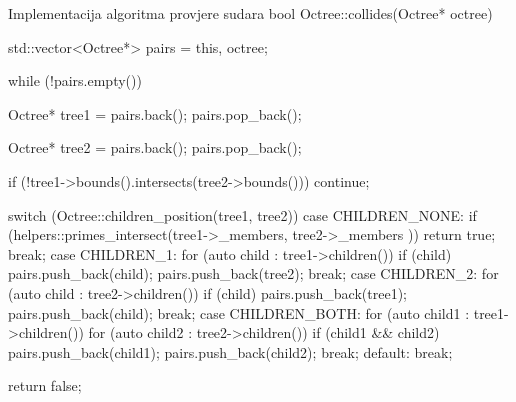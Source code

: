 \begin{cppSource}{Implementacija algoritma provjere sudara}
  bool Octree::collides(Octree* octree) {
    std::vector<Octree*> pairs = {this, octree};

    while (!pairs.empty()) {
        Octree* tree1 = pairs.back();
        pairs.pop_back();

        Octree* tree2 = pairs.back();
        pairs.pop_back();

        if (!tree1->bounds().intersects(tree2->bounds())) continue;

        switch (Octree::children_position(tree1, tree2)) {
            case CHILDREN_NONE:
                if (helpers::primes_intersect({tree1->_members, tree2->_members}
                    )) {
                    return true;
                }
                break;
            case CHILDREN_1:
                for (auto child : tree1->children())
                    if (child) {
                        pairs.push_back(child);
                        pairs.push_back(tree2);
                    }
                break;
            case CHILDREN_2:
                for (auto child : tree2->children())
                    if (child) {
                        pairs.push_back(tree1);
                        pairs.push_back(child);
                    }
                break;
            case CHILDREN_BOTH:
                for (auto child1 : tree1->children())
                    for (auto child2 : tree2->children())
                        if (child1 && child2) {
                            pairs.push_back(child1);
                            pairs.push_back(child2);
                        }
                break;
            default:
                break;
        }
    }

    return false;
  }
\end{cppSource}

